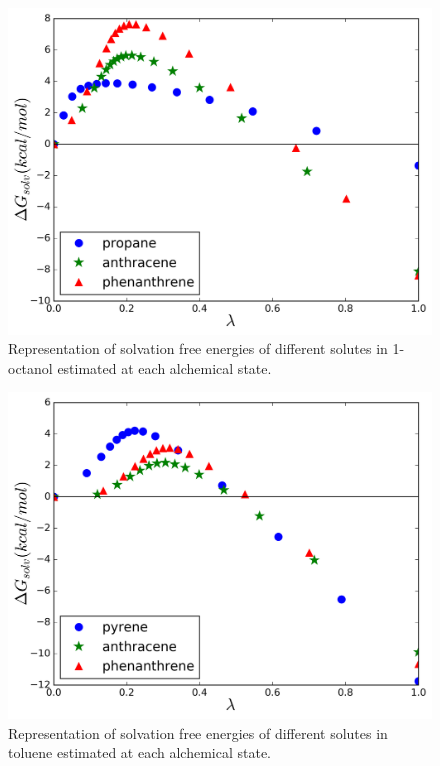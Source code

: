 \documentclass[final,12p,times,twocolumn]{elsarticle}
\begin{document}
	\begin{figure}[h]
		\centering
		\includegraphics[width=1.0\linewidth]{Figures/octart}
		\caption{Representation of solvation free energies of different solutes in 1-octanol estimated at each alchemical state.}
		\label{fig:oct}
	\end{figure}
	\begin{figure}[h]
		\centering
		\includegraphics[width=1.0\linewidth]{Figures/tolart}
		\caption{Representation of solvation free energies of different solutes in toluene estimated at each alchemical state. }
		\label{fig:tol}
	\end{figure}
		
\end{document}
